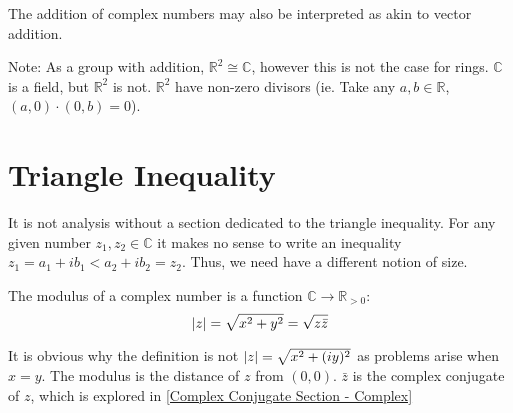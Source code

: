 \documentclass[12pt, english]{book}
\begin{document}
	The addition of complex numbers may also be interpreted as akin to vector addition. 
	\begin{center}
	\end{center}
	Note: As a group with addition, \(\mathbb{R}^2 \cong \mathbb{C}\), however this is not the case for rings. \(\mathbb{C}\) is a field, but \(\mathbb{R}^2\) is not. \(\mathbb{R}^2\) have non-zero divisors (ie. Take any \(a,b \in \mathbb{R}\), \((a, 0) \cdot (0, b) = 0\)).
	
	\section{Triangle Inequality} \label{Triangle Inequality Section - Complex}
	It is not analysis without a section dedicated to the triangle inequality. For any given number $z_1, z_2 \in \mathbb{C}$ it makes no sense to write an inequality $z_1 = a_1 + ib_1 <  a_2 + ib_2 = z_2$. Thus, we need have a different notion of size. 
	
	\begin{definition}[Modulus]
		The modulus of a complex number is a function $\mathbb{C} \rightarrow \mathbb{R}_{>0}$:
		$$\abs{z} = \sqrt{x^2 + y^2} = \sqrt{z \bar{z}}$$
	\end{definition}
	It is obvious why the definition is not $\abs{z} = \sqrt{x^2 + (iy)^2}$ as problems arise when $x = y$. The modulus is the distance of $z$ from $(0, 0)$. $\bar{z}$ is the complex conjugate of $z$, which is explored in \cref{Complex Conjugate Section - Complex}
	
\end{document}
